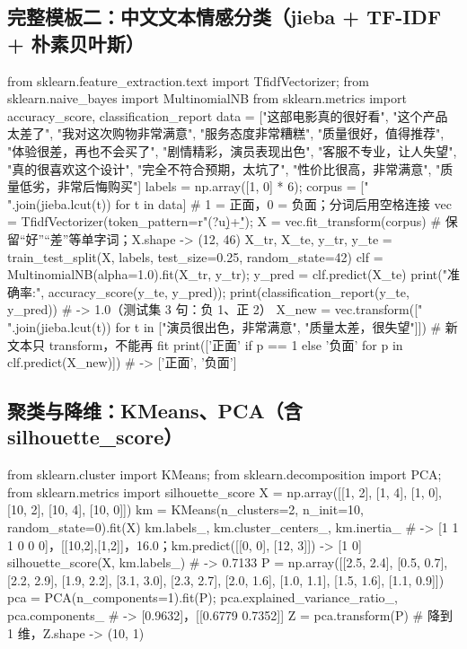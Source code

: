 \subsection{完整模板二：中文文本情感分类（jieba + TF-IDF + 朴素贝叶斯）}
\begin{PYQcode}
from sklearn.feature_extraction.text import TfidfVectorizer; from sklearn.naive_bayes import MultinomialNB
from sklearn.metrics import accuracy_score, classification_report
data = ["这部电影真的很好看", "这个产品太差了", "我对这次购物非常满意", "服务态度非常糟糕", "质量很好，值得推荐", "体验很差，再也不会买了",
        "剧情精彩，演员表现出色", "客服不专业，让人失望", "真的很喜欢这个设计", "完全不符合预期，太坑了", "性价比很高，非常满意", "质量低劣，非常后悔购买"]
labels = np.array([1, 0] * 6); corpus = [" ".join(jieba.lcut(t)) for t in data]   # 1 = 正面，0 = 负面；分词后用空格连接
vec = TfidfVectorizer(token_pattern=r"(?u)\b\w+\b"); X = vec.fit_transform(corpus)   # 保留“好”“差”等单字词；X.shape -> (12, 46)
X_tr, X_te, y_tr, y_te = train_test_split(X, labels, test_size=0.25, random_state=42)
clf = MultinomialNB(alpha=1.0).fit(X_tr, y_tr); y_pred = clf.predict(X_te)
print("准确率:", accuracy_score(y_te, y_pred)); print(classification_report(y_te, y_pred))   # -> 1.0（测试集 3 句：负 1、正 2）
X_new = vec.transform([" ".join(jieba.lcut(t)) for t in ["演员很出色，非常满意", "质量太差，很失望"]])  # 新文本只 transform，不能再 fit
print(['正面' if p == 1 else '负面' for p in clf.predict(X_new)])   # -> ['正面', '负面']
\end{PYQcode}

\subsection{聚类与降维：KMeans、PCA（含 silhouette\_score）}
\begin{PYQcode}
from sklearn.cluster import KMeans; from sklearn.decomposition import PCA; from sklearn.metrics import silhouette_score
X = np.array([[1, 2], [1, 4], [1, 0], [10, 2], [10, 4], [10, 0]])
km = KMeans(n_clusters=2, n_init=10, random_state=0).fit(X)
km.labels_, km.cluster_centers_, km.inertia_   # -> [1 1 1 0 0 0]，[[10,2],[1,2]]，16.0；km.predict([[0, 0], [12, 3]]) -> [1 0]
silhouette_score(X, km.labels_)                # -> 0.7133
P = np.array([[2.5, 2.4], [0.5, 0.7], [2.2, 2.9], [1.9, 2.2], [3.1, 3.0], [2.3, 2.7], [2.0, 1.6], [1.0, 1.1], [1.5, 1.6], [1.1, 0.9]])
pca = PCA(n_components=1).fit(P); pca.explained_variance_ratio_, pca.components_   # -> [0.9632]，[[0.6779 0.7352]]
Z = pca.transform(P)                             # 降到 1 维，Z.shape -> (10, 1)
\end{PYQcode}

